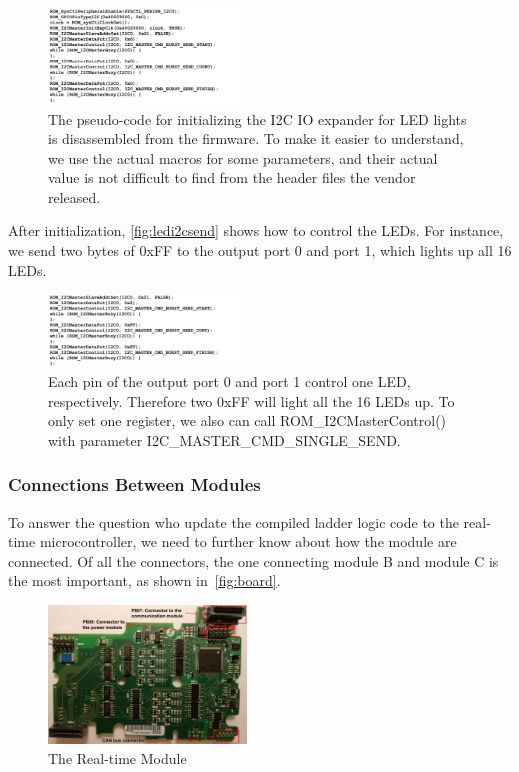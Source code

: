 \begin{figure}[th]
	\includegraphics[width=0.47\textwidth]{figures/ledi2cinit}
	\centering
	\caption{The pseudo-code for initializing the I2C IO expander for LED lights is disassembled from the firmware. To make it easier to understand, we use the actual macros for some parameters, and their actual value is not difficult to find from the header files the vendor released.}
	\label{fig:ledi2cinit}
\end{figure}



After initialization, \autoref{fig:ledi2csend} shows how to control the LEDs. For instance, we send two bytes of 0xFF to the output port 0 and port 1, which lights up all 16 LEDs.


\begin{figure}[th]
	\includegraphics[width=0.47\textwidth]{figures/ledi2csend}
	\centering
	\caption{Each pin of the output port 0 and port 1 control one LED, respectively. Therefore two 0xFF will light all the 16 LEDs up. To only set one register, we also can call  ROM\_I2CMasterControl() with parameter I2C\_MASTER\_CMD\_SINGLE\_SEND.}
	\label{fig:ledi2csend}
\end{figure}



\subsubsection{Connections Between Modules}

To answer the question who update the compiled ladder logic code to the real-time microcontroller, we need to further know about how the module are connected. Of all the connectors, the one connecting module B and module C is the most important, as shown in~\autoref{fig:board}. 

\begin{figure}[th]
	\includegraphics[width=0.47\textwidth]{figures/board}
	\centering
	\caption{The Real-time Module}
	\label{fig:board}
\end{figure}

